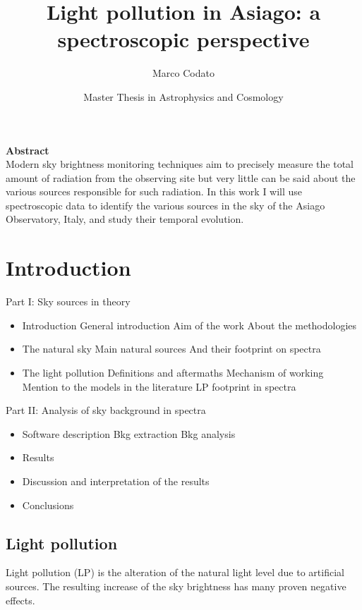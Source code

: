 \documentclass{book}
\title{Light pollution in Asiago: a spectroscopic perspective}
\author{Marco Codato}
\date{Master Thesis in Astrophysics and Cosmology}
\begin{document}
\maketitle

\newpage
\begin{center}
	\textbf{Abstract}\\
	Modern sky brightness monitoring techniques aim to precisely measure the total amount of radiation from the observing site but very little can be said about the various sources responsible for such radiation.
	In this work I will use spectroscopic data to identify the various sources in the sky of the Asiago Observatory, Italy, and study their temporal evolution.
\end{center}

\tableofcontents

\chapter{Introduction}
Part I: Sky sources in theory
\begin{itemize}
	\item Introduction
		\subitem General introduction
		\subitem Aim of the work
		\subitem About the methodologies
	\item The natural sky
		\subitem Main natural sources
		\subitem And their footprint on spectra
	\item The light pollution
		\subitem Definitions and aftermaths
		\subitem Mechanism of working
		\subitem Mention to the models in the literature
		\subitem LP footprint in spectra
\end{itemize}
Part II: Analysis of sky background in spectra
\begin{itemize}
	\item Software description
		\subitem Bkg extraction
		\subitem Bkg analysis
	\item Results
	\item Discussion and interpretation of the results
	\item Conclusions
\end{itemize}

\section{Light pollution}
Light pollution (LP) is the alteration of the natural light level due to artificial sources. The resulting increase of the sky brightness has many proven negative effects.
\end{document}
